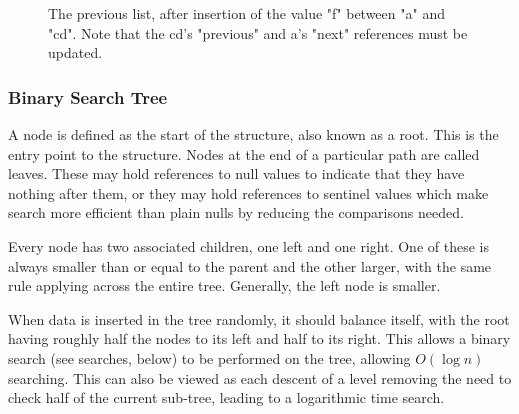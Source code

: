 \documentclass[]{article}
\begin{document}
\begin{figure}[ph]
\centering
{}
\caption{The previous list, after insertion of the value "f" between "a" and "cd". Note that the cd's "previous" and a's "next" references must be updated.}
\end{figure}

\subsubsection{Binary Search Tree}

A node is defined as the start of the structure, also known as a root. This is the entry point to the structure. Nodes at the end of a particular path are called leaves. These may hold references to null values to indicate that they have nothing after them, or they may hold references to sentinel values which make search more efficient than plain nulls by reducing the comparisons needed.

Every node has two associated children, one left and one right. One of these is always smaller than or equal to the parent and the other larger, with the same rule applying across the entire tree. Generally, the left node is smaller.

When data is inserted in the tree randomly, it should balance itself, with the root having roughly half the nodes to its left and half to its right. This allows a binary search (see searches, below) to be performed on the tree, allowing $O(\log{n})$ searching. This can also be viewed as each descent of a level removing the need to check half of the current sub-tree, leading to a logarithmic time search.
\end{document}
